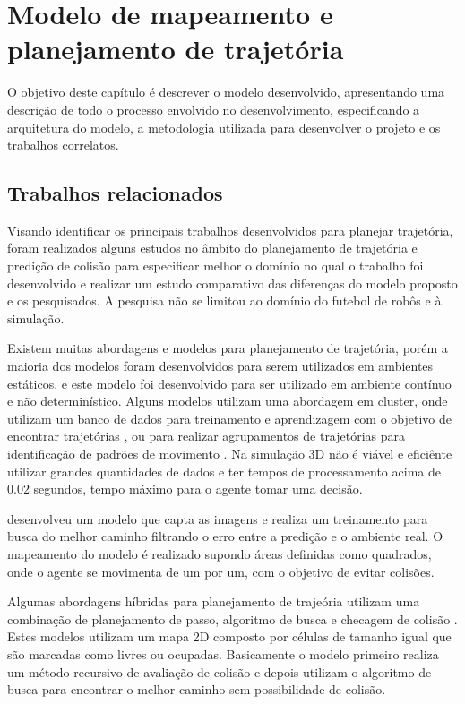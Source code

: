 \chapter{Modelo de mapeamento e planejamento de trajetória}
\label{chap:desenv}
O objetivo deste capítulo é descrever o modelo desenvolvido, apresentando uma descrição de todo o processo envolvido no 
desenvolvimento, especificando a arquitetura do modelo, a metodologia utilizada para desenvolver o projeto e os trabalhos 
correlatos.

\section{Trabalhos relacionados}
\label{sec:trabalhosrelacionados}
Visando identificar os principais trabalhos desenvolvidos para planejar trajetória, foram realizados alguns estudos no âmbito 
do planejamento de trajetória e predição de colisão para especificar melhor o domínio no qual o trabalho foi desenvolvido e 
realizar um estudo comparativo das diferenças do modelo proposto e os pesquisados. A pesquisa não se limitou ao domínio do futebol 
de robôs e \`a simulação.

Existem muitas abordagens e modelos para planejamento de trajetória, porém a maioria dos modelos foram desenvolvidos para serem 
utilizados em ambientes estáticos, e este modelo foi desenvolvido para ser utilizado em ambiente contínuo e não determinístico. 
Alguns modelos utilizam uma abordagem em cluster, onde utilizam um banco de dados para treinamento e aprendizagem com o objetivo 
de encontrar trajetórias \cite{Jetchev}, ou para realizar agrupamentos de trajetórias para identificação de padrões de movimento 
\cite{sungFeldman}. Na simulação 3D não é viável e eficiênte utilizar grandes quantidades de dados e ter tempos de processamento 
acima de $0.02$ segundos, tempo máximo para o agente tomar uma decisão.

 desenvolveu um modelo que capta as imagens e realiza um treinamento para busca do melhor caminho filtrando o erro entre a 
predição e o ambiente real. O mapeamento do modelo é realizado supondo áreas definidas como quadrados, onde o agente se movimenta de 
um por um, com o objetivo de evitar colisões.

Algumas abordagens híbridas para planejamento de trajeória utilizam uma combinação de planejamento de passo, algoritmo de busca e 
checagem de colisão \cite{hamasaki}\cite{phornungfootstep}. Estes modelos utilizam um mapa 2D composto por células de tamanho igual que são 
marcadas como livres ou ocupadas. Basicamente o modelo primeiro realiza um método recursivo de avaliação de colisão e depois utilizam o 
algoritmo de busca para encontrar o melhor caminho sem possibilidade de colisão.

